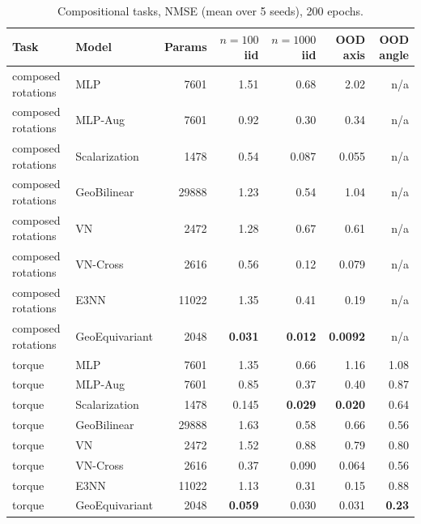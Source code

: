 \documentclass[11pt]{article}
\begin{document}
\begin{table}[t]
\centering
\caption{Compositional tasks, NMSE (mean over 5 seeds), 200 epochs.}
\label{tab:compositional}
\small
\begin{tabular}{llrrrrr}
\toprule
Task & Model & Params & $n{=}100$ iid & $n{=}1000$ iid & OOD axis & OOD angle \\
\midrule
composed rotations & MLP & 7601 & 1.51 & 0.68 & 2.02 & n/a \\
composed rotations & MLP-Aug & 7601 & 0.92 & 0.30 & 0.34 & n/a \\
composed rotations & Scalarization & 1478 & 0.54 & 0.087 & 0.055 & n/a \\
composed rotations & GeoBilinear & 29888 & 1.23 & 0.54 & 1.04 & n/a \\
composed rotations & VN & 2472 & 1.28 & 0.67 & 0.61 & n/a \\
composed rotations & VN-Cross & 2616 & 0.56 & 0.12 & 0.079 & n/a \\
composed rotations & E3NN & 11022 & 1.35 & 0.41 & 0.19 & n/a \\
composed rotations & GeoEquivariant & 2048 & \textbf{0.031} & \textbf{0.012} & \textbf{0.0092} & n/a \\
\midrule
torque & MLP & 7601 & 1.35 & 0.66 & 1.16 & 1.08 \\
torque & MLP-Aug & 7601 & 0.85 & 0.37 & 0.40 & 0.87 \\
torque & Scalarization & 1478 & 0.145 & \textbf{0.029} & \textbf{0.020} & 0.64 \\
torque & GeoBilinear & 29888 & 1.63 & 0.58 & 0.66 & 0.56 \\
torque & VN & 2472 & 1.52 & 0.88 & 0.79 & 0.80 \\
torque & VN-Cross & 2616 & 0.37 & 0.090 & 0.064 & 0.56 \\
torque & E3NN & 11022 & 1.13 & 0.31 & 0.15 & 0.88 \\
torque & GeoEquivariant & 2048 & \textbf{0.059} & 0.030 & 0.031 & \textbf{0.23} \\
\bottomrule
\end{tabular}
\end{table}
\end{document}
